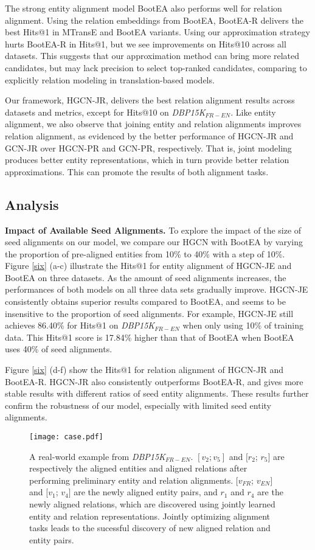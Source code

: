\documentclass[11pt,a4paper]{article}
\newcommand\cparagraph[1]{\vspace{1mm}\noindent\textbf{#1.}}
\begin{document}
The strong entity alignment model BootEA also performs well for relation alignment.
Using the relation embeddings from BootEA, BootEA-R
delivers the best Hits@1 in MTransE and BootEA variants. Using our approximation strategy hurts BootEA-R in Hits@1, but we see improvements on Hits@10 across all datasets. This suggests that our approximation method can bring more related candidates, but may lack precision to select top-ranked candidates, comparing to explicitly relation modeling in translation-based models.


Our framework, HGCN-JR, delivers the best relation alignment results across datasets and metrics, except for Hits@10 on \textit{DBP15K}$_{FR-EN}$. Like entity alignment, we also observe
that joining entity and relation alignments improves relation alignment, as evidenced by the better performance of HGCN-JR and GCN-JR
over HGCN-PR and GCN-PR, respectively. That is, joint modeling produces better entity representations, which in turn provide better relation approximations. This can promote the results of both alignment tasks.


\subsection{Analysis\label{sec:prioralignmentdata}}
\cparagraph{Impact of Available Seed Alignments}
To explore the impact of the size of seed alignments on our model, we compare our HGCN with BootEA by varying the
proportion of pre-aligned entities from 10\% to 40\% with a step of 10\%. Figure \ref{six} (a-c) illustrate the Hits@1 for entity alignment of HGCN-JE and BootEA on three datasets. As the amount of seed alignments increases, the performances of both models on all three data sets gradually improve. HGCN-JE consistently obtains superior results compared to BootEA, and seems to be
insensitive to the proportion of seed alignments. For example, HGCN-JE still achieves 86.40\% for Hits@1 on \textit{DBP15K}$_{FR-EN}$ when only using 10\% of training data. This Hits@1 score is 17.84\% higher than that of BootEA when BootEA uses 40\% of seed alignments.

Figure \ref{six} (d-f) show the Hits@1 for relation alignment of HGCN-JR and BootEA-R. HGCN-JR also consistently outperforms BootEA-R, and gives more stable results with different ratios of seed entity alignments.
These results further confirm the robustness of our model, especially with limited seed entity alignments.

\begin{figure}[t!]
	\centering
	\texttt{[image: case.pdf]}
	\caption{A real-world example from \textit{DBP15K}$_{FR-EN}$. $[v_2; v_5]$ and $[r_2$; $r_5]$ are respectively the aligned entities and aligned relations after performing preliminary entity and relation alignments. $[v_{FR}$; $v_{EN}]$ and $[v_1$; $v_4]$ are the newly aligned entity pairs, and $r_1$ and $r_4$ are the newly aligned relations, which are discovered using jointly learned entity and relation representations. Jointly optimizing alignment tasks leads to the sucessful discovery of new aligned relation and entity pairs.}
	\label{case}
\end{figure}
\end{document}
